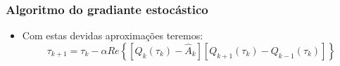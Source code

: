 \begin{frame}
	\frametitle{Algoritmo do gradiante estocástico}

	\begin{itemize}
		\item Com estas devidas aproximações teremos:
		\begin{equation*}
		\tau_{k+1} =  \tau_k -\alpha Re\left\{   [Q_k(\tau_k) - \hat{A}_k][Q_{k+1}(\tau_k) - Q_{k-1}(\tau_k)] \right\}
		\end{equation*}
		
	\end{itemize}
\end{frame}
